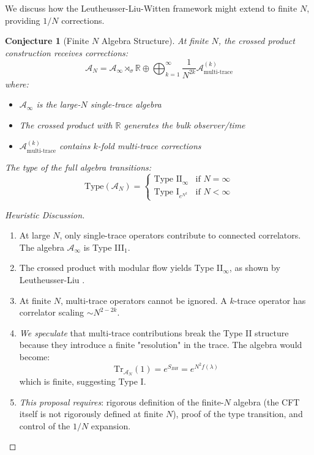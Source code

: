 \documentclass[12pt,a4paper]{article}
\newtheorem{conjecture}[theorem]{Conjecture}
\begin{document}
We discuss how the Leutheusser-Liu-Witten framework might extend to finite $N$, providing $1/N$ corrections.

\begin{conjecture}[Finite $N$ Algebra Structure]
At finite $N$, the crossed product construction receives corrections:
\begin{equation}
\mathcal{A}_N = \mathcal{A}_\infty \rtimes_{\sigma} \mathbb{R} \oplus \bigoplus_{k=1}^\infty \frac{1}{N^{2k}} \mathcal{A}^{(k)}_{\text{multi-trace}}
\end{equation}
where:
\begin{itemize}
    \item $\mathcal{A}_\infty$ is the large-$N$ single-trace algebra
    \item The crossed product with $\mathbb{R}$ generates the bulk observer/time
    \item $\mathcal{A}^{(k)}_{\text{multi-trace}}$ contains $k$-fold multi-trace corrections
\end{itemize}
The type of the full algebra transitions:
\begin{equation}
\text{Type}(\mathcal{A}_N) = \begin{cases}
\text{Type II}_\infty & \text{if } N = \infty \\
\text{Type I}_{e^{N^2}} & \text{if } N < \infty
\end{cases}
\end{equation}
\end{conjecture}

\begin{proof}[Heuristic Discussion]
\begin{enumerate}
    \item At large $N$, only single-trace operators contribute to connected correlators. The algebra $\mathcal{A}_\infty$ is Type III$_1$.
    
    \item The crossed product with modular flow yields Type II$_\infty$, as shown by Leutheusser-Liu \cite{leutheusser2023}.
    
    \item At finite $N$, multi-trace operators cannot be ignored. A $k$-trace operator has correlator scaling $\sim N^{2-2k}$.
    
    \item \textit{We speculate} that multi-trace contributions break the Type II structure because they introduce a finite "resolution" in the trace. The algebra would become:
    \begin{equation}
    \text{Tr}_{\mathcal{A}_N}(1) = e^{S_{BH}} = e^{N^2 f(\lambda)}
    \end{equation}
    which is finite, suggesting Type I.
    
    \item \textit{This proposal requires}: rigorous definition of the finite-$N$ algebra (the CFT itself is not rigorously defined at finite $N$), proof of the type transition, and control of the $1/N$ expansion.
\end{enumerate}
\end{proof}
\end{document}
